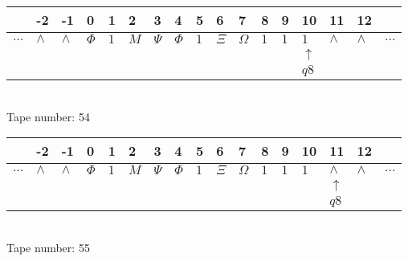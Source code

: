 \documentclass{article}
\begin{document}
\begin{table}[H]
\centering
\begin{tabular}{lllllllllllllllll}
 & -2 & -1 & 0 & 1 & 2 & 3 & 4 & 5 & 6 & 7 & 8 & 9 & 10 & 11 & 12 & \\
\hline
$...$ & \multicolumn{1}{|l|}{$\wedge$} & \multicolumn{1}{|l|}{$\wedge$} & \multicolumn{1}{|l|}{$\Phi$} & \multicolumn{1}{|l|}{$1$} & \multicolumn{1}{|l|}{$M$} & \multicolumn{1}{|l|}{$\Psi$} & \multicolumn{1}{|l|}{$\Phi$} & \multicolumn{1}{|l|}{$1$} & \multicolumn{1}{|l|}{$\Xi$} & \multicolumn{1}{|l|}{$\Omega$} & \multicolumn{1}{|l|}{$1$} & \multicolumn{1}{|l|}{$1$} & \multicolumn{1}{|l|}{$1$} & \multicolumn{1}{|l|}{$\wedge$} & \multicolumn{1}{|l|}{$\wedge$} & $...$\\
\hline
&  &  &  &  &  &  &  &  &  &  &  &  & $\uparrow$ &  &  &  \\
&  &  &  &  &  &  &  &  &  &  &  &  & $ q8 $ &  &  &  \\
\end{tabular}
\\
Tape number: 54
\noindent\makebox[\linewidth]{\hdashrule{\textwidth}{1pt}{1pt}}\end{table}

\begin{table}[H]
\centering
\begin{tabular}{lllllllllllllllll}
 & -2 & -1 & 0 & 1 & 2 & 3 & 4 & 5 & 6 & 7 & 8 & 9 & 10 & 11 & 12 & \\
\hline
$...$ & \multicolumn{1}{|l|}{$\wedge$} & \multicolumn{1}{|l|}{$\wedge$} & \multicolumn{1}{|l|}{$\Phi$} & \multicolumn{1}{|l|}{$1$} & \multicolumn{1}{|l|}{$M$} & \multicolumn{1}{|l|}{$\Psi$} & \multicolumn{1}{|l|}{$\Phi$} & \multicolumn{1}{|l|}{$1$} & \multicolumn{1}{|l|}{$\Xi$} & \multicolumn{1}{|l|}{$\Omega$} & \multicolumn{1}{|l|}{$1$} & \multicolumn{1}{|l|}{$1$} & \multicolumn{1}{|l|}{$1$} & \multicolumn{1}{|l|}{$\wedge$} & \multicolumn{1}{|l|}{$\wedge$} & $...$\\
\hline
&  &  &  &  &  &  &  &  &  &  &  &  &  & $\uparrow$ &  &  \\
&  &  &  &  &  &  &  &  &  &  &  &  &  & $ q8 $ &  &  \\
\end{tabular}
\\
Tape number: 55
\noindent\makebox[\linewidth]{\hdashrule{\textwidth}{1pt}{1pt}}\end{table}
\end{document}
